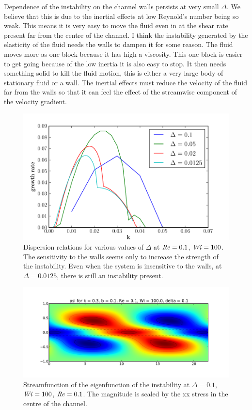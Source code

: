 \documentclass{jfm}
\newcommand\Wi{\mbox{\textit{Wi}}}
\newcommand\Rey{\mbox{\textit{Re}}}  %
\begin{document}
Dependence of the instability on the channel walls persists at very small $\Delta$. We believe that this is due to the inertial effects at low Reynold's number being so weak. This means it is very easy to move the fluid even in at the shear rate present far from the centre of the channel. I think the instability generated by the elasticity of the fluid needs the walls to dampen it for some reason. The fluid moves more as one block because it has high a viscosity. This one block is easier to get going because of the low inertia it is also easy to stop. It then needs something solid to kill the fluid motion, this is either a very large body of stationary fluid or a wall. The inertial effects must reduce the velocity of the fluid far from the walls so that it can feel the effect of the streamwise component of the velocity gradient.

\begin{figure}
    \centering
    \includegraphics[width=\textwidth]{KH_vary_delta}
    \caption{Dispersion relations for various values of $\Delta$ at $\Rey = 0.1$, $\Wi = 100$. The sensitivity to the walls seems only to increase the strength of the instability. Even when the system is insensitive to the walls, at $\Delta= 0.0125$, there is still an instability present.}
    \label{fig:walls_dependence}
\end{figure}

\begin{figure}
    \centering
    \includegraphics[width=\textwidth]{psi_high_delta}
    \caption{Streamfunction of the eigenfunction of the instability at $\Delta = 0.1$, $\Wi = 100$, $\Rey=0.1$. The magnitude is scaled by the xx stress in the centre of the channel.}
    \label{fig:psi_high_delta}
\end{figure}
\end{document}
